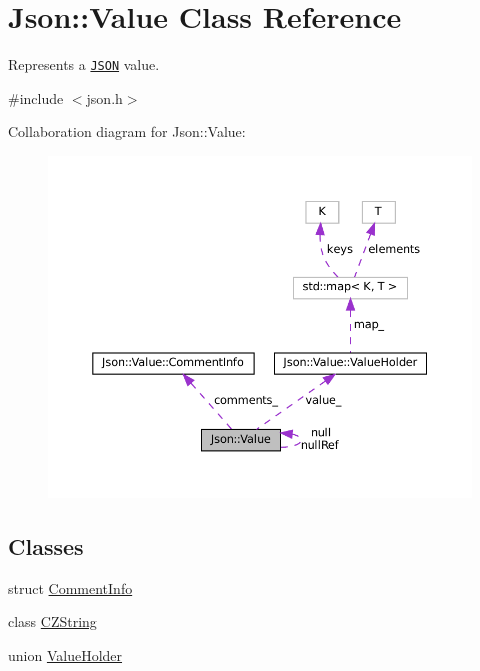 \hypertarget{classJson_1_1Value}{}\section{Json\+:\+:Value Class Reference}
\label{classJson_1_1Value}


Represents a \href{http://www.json.org}{\tt J\+S\+ON} value.  




{\ttfamily \#include $<$json.\+h$>$}



Collaboration diagram for Json\+:\+:Value\+:
\nopagebreak
\begin{figure}[H]
\begin{center}
\leavevmode
\includegraphics[width=350pt]{classJson_1_1Value__coll__graph}
\end{center}
\end{figure}
\subsection*{Classes}
\begin{DoxyCompactItemize}
\item 
struct \hyperlink{structJson_1_1Value_1_1CommentInfo}{Comment\+Info}
\item 
class \hyperlink{classJson_1_1Value_1_1CZString}{C\+Z\+String}
\item 
union \hyperlink{unionJson_1_1Value_1_1ValueHolder}{Value\+Holder}
\end{DoxyCompactItemize}
